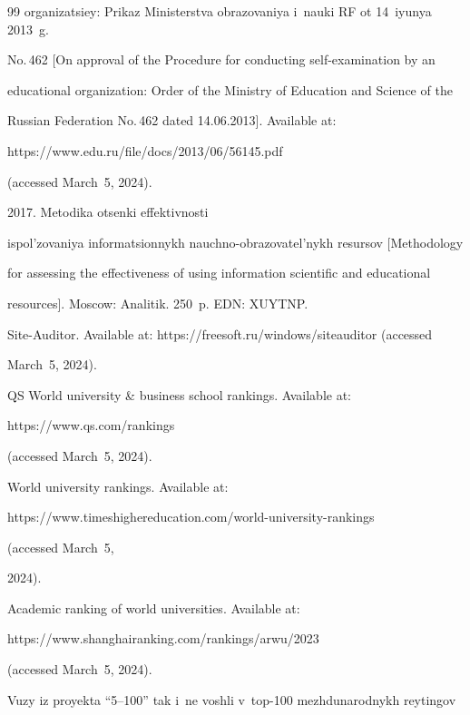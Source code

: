 {{\begin{thebibliography}{99}
or\-ga\-ni\-za\-tsi\-ey: Prikaz Ministerstva obrazovaniya i~nauki RF ot 14~iyunya 2013~g. 


No.\,462 [On approval of the Procedure for conducting self-examination by an 


educational organization: Order of the Ministry of Education and Science of the 


Russian Federation No.\,462 dated 14.06.2013]. Available at: {\sf 


https://www.edu.ru/file/docs/2013/06/56145.pdf} (accessed March~5, 2024).




   2017. Metodika otsenki effektivnosti 


ispol'zovaniya informatsionnykh nauchno-obrazovatel'nykh resursov [Methodology 


for assessing the effectiveness of using information scientific and educational 


resources]. Moscow: Analitik. 250~p. EDN: XUYTNP.




  Site-Auditor. Available at: {\sf https://freesoft.ru/windows/siteauditor} (accessed 


March~5, 2024).




  QS World university \& business school rankings. Available at: {\sf 


https://www.qs.\linebreak com/rankings} (accessed March~5, 2024).




  World university rankings. Available at: {\sf  


https://www.timeshighereducation.com/\linebreak  world-university-rankings} (accessed March~5, 


2024).




  Academic ranking of world universities. Available at: {\sf 


https://www.shanghairanking.\linebreak com/rankings/arwu/2023} (accessed March~5, 2024).




  Vuzy iz proyekta ``5--100'' tak i~ne voshli v~top-100 mezh\-du\-na\-rod\-nykh reytingov 



\end{thebibliography}}}

